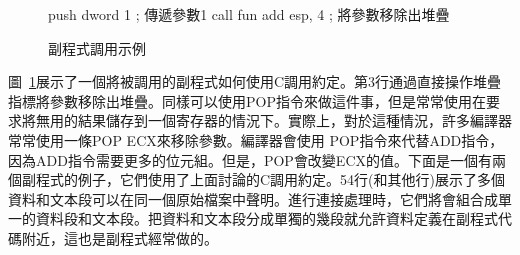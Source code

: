 \begin{figure}[t]
\begin{AsmCodeListing}[frame=single]
      push   dword 1        ; 傳遞參數1
      call   fun
      add    esp, 4         ; 將參數移除出堆疊
\end{AsmCodeListing}
\caption{副程式調用示例 \label{fig:subcall}}
\end{figure}

圖~\ref{fig:subcall}展示了一個將被調用的副程式如何使用C調用約定。第3行通過直接操作堆疊指標將參數移除出堆疊。同樣可以使用{\code POP}指令來做這件事，但是常常使用在要求將無用的結果儲存到一個寄存器的情況下。實際上，對於這種情況，許多編譯器常常使用一條{\code POP ECX}來移除參數。編譯器會使用{\code
POP}指令來代替{\code ADD}指令，因為{\code ADD}指令需要更多的位元組。但是，{\code POP}會改變ECX的值。下面是一個有兩個副程式的例子，它們使用了上面討論的C調用約定。54行(和其他行)展示了多個資料和文本段可以在同一個原始檔案中聲明。進行連接處理時，它們將會組合成單一的資料段和文本段。把資料和文本段分成單獨的幾段就允許資料定義在副程式代碼附近，這也是副程式經常做的。

